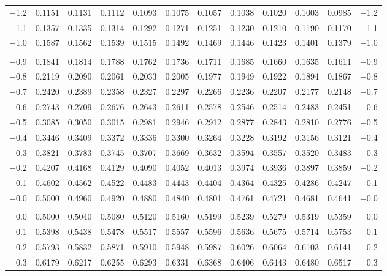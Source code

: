 \documentclass[12pt]{article}
\begin{document}
\begin{landscape}
\begin{adjustbox}{angle=270}
\begin{tabular}{
  r 
  @{\hspace{4.5mm}}
  *{5}{c @{\hspace{2.5mm}}} 
  @{\hspace{-0.5mm}}
  *{5}{@{\hspace{2.5mm}} c} 
  @{\hspace{2mm}}
  r
  }
$-$1.2	&	0.1151	&	0.1131	&	0.1112	&	0.1093	&	0.1075	&	0.1057	&	0.1038	&	0.1020	&	0.1003	&	0.0985	&	$-$1.2	\\
$-$1.1	&	0.1357	&	0.1335	&	0.1314	&	0.1292	&	0.1271	&	0.1251	&	0.1230	&	0.1210	&	0.1190	&	0.1170	&	$-$1.1	\\
$-$1.0	&	0.1587	&	0.1562	&	0.1539	&	0.1515	&	0.1492	&	0.1469	&	0.1446	&	0.1423	&	0.1401	&	0.1379	&	$-$1.0	\\
&&&&&&&&&&{} \\																							
$-$0.9	&	0.1841	&	0.1814	&	0.1788	&	0.1762	&	0.1736	&	0.1711	&	0.1685	&	0.1660	&	0.1635	&	0.1611	&	$-$0.9	\\
$-$0.8	&	0.2119	&	0.2090	&	0.2061	&	0.2033	&	0.2005	&	0.1977	&	0.1949	&	0.1922	&	0.1894	&	0.1867	&	$-$0.8	\\
$-$0.7	&	0.2420	&	0.2389	&	0.2358	&	0.2327	&	0.2297	&	0.2266	&	0.2236	&	0.2207	&	0.2177	&	0.2148	&	$-$0.7	\\
$-$0.6	&	0.2743	&	0.2709	&	0.2676	&	0.2643	&	0.2611	&	0.2578	&	0.2546	&	0.2514	&	0.2483	&	0.2451	&	$-$0.6	\\
$-$0.5	&	0.3085	&	0.3050	&	0.3015	&	0.2981	&	0.2946	&	0.2912	&	0.2877	&	0.2843	&	0.2810	&	0.2776	&	$-$0.5	\\
$-$0.4	&	0.3446	&	0.3409	&	0.3372	&	0.3336	&	0.3300	&	0.3264	&	0.3228	&	0.3192	&	0.3156	&	0.3121	&	$-$0.4	\\
$-$0.3	&	0.3821	&	0.3783	&	0.3745	&	0.3707	&	0.3669	&	0.3632	&	0.3594	&	0.3557	&	0.3520	&	0.3483	&	$-$0.3	\\
$-$0.2	&	0.4207	&	0.4168	&	0.4129	&	0.4090	&	0.4052	&	0.4013	&	0.3974	&	0.3936	&	0.3897	&	0.3859	&	$-$0.2	\\
$-$0.1	&	0.4602	&	0.4562	&	0.4522	&	0.4483	&	0.4443	&	0.4404	&	0.4364	&	0.4325	&	0.4286	&	0.4247	&	$-$0.1	\\
$-$0.0	&	0.5000	&	0.4960	&	0.4920	&	0.4880	&	0.4840	&	0.4801	&	0.4761	&	0.4721	&	0.4681	&	0.4641	&	$-$0.0	\\ 
&&&&&&&&&&{} \\																							
0.0	&	0.5000	&	0.5040	&	0.5080	&	0.5120	&	0.5160	&	0.5199	&	0.5239	&	0.5279	&	0.5319	&	0.5359	&	0.0	\\
0.1	&	0.5398	&	0.5438	&	0.5478	&	0.5517	&	0.5557	&	0.5596	&	0.5636	&	0.5675	&	0.5714	&	0.5753	&	0.1	\\
0.2	&	0.5793	&	0.5832	&	0.5871	&	0.5910	&	0.5948	&	0.5987	&	0.6026	&	0.6064	&	0.6103	&	0.6141	&	0.2	\\
0.3	&	0.6179	&	0.6217	&	0.6255	&	0.6293	&	0.6331	&	0.6368	&	0.6406	&	0.6443	&	0.6480	&	0.6517	&	0.3	\\

\end{tabular}
\end{adjustbox}
\end{landscape}
\end{document}
